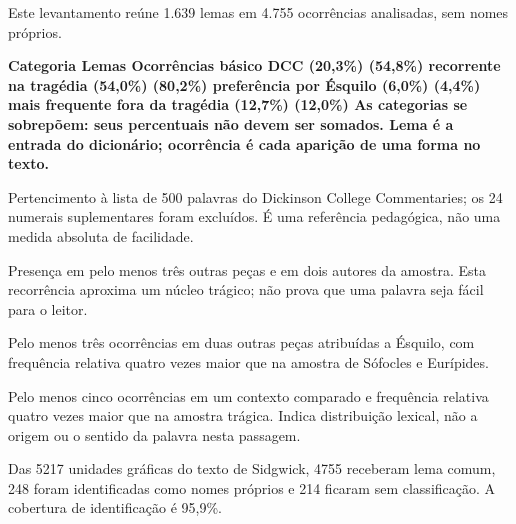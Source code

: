 \page
\setupbackgrounds[page][background=appendixfurniture]
\switchtobodyfont[11pt]
\setupinterlinespace[line=15pt]
\par
{}\par
\blank[2mm]
Este levantamento reúne 1.639 lemas em 4.755 ocorrências analisadas, sem nomes próprios.
\par\blank[3mm]
\starttabulate[|p(56mm)|r|r|]
\NC \bf Categoria \NC \bf Lemas \NC \bf Ocorrências \NC\NR
\HL
\NC básico DCC (20,3\%)  (54,8\%) \NC\NR
\NC recorrente na tragédia (54,0\%)  (80,2\%) \NC\NR
\NC preferência por Ésquilo (6,0\%)  (4,4\%) \NC\NR
\NC mais frequente fora da tragédia (12,7\%)  (12,0\%) \NC\NR
\stoptabulate
\blank[3mm]
As categorias se sobrepõem: seus percentuais não devem ser somados. Lema é a entrada do dicionário; ocorrência é cada aparição de uma forma no texto.\par
{}\par
{} Pertencimento à lista de 500 palavras do Dickinson College Commentaries; os 24 numerais suplementares foram excluídos. É uma referência pedagógica, não uma medida absoluta de facilidade.\par
{} Presença em pelo menos três outras peças e em dois autores da amostra. Esta recorrência aproxima um núcleo trágico; não prova que uma palavra seja fácil para o leitor.\par
{} Pelo menos três ocorrências em duas outras peças atribuídas a Ésquilo, com frequência relativa quatro vezes maior que na amostra de Sófocles e Eurípides.\par
{} Pelo menos cinco ocorrências em um contexto comparado e frequência relativa quatro vezes maior que na amostra trágica. Indica distribuição lexical, não a origem ou o sentido da palavra nesta passagem.\par
\page
{\switchtobodyfont[18pt]\color[accent]{Corpus e limites}}\par
{}\par
\blank[2mm]
Das 5217 unidades gráficas do texto de Sidgwick, 4755 receberam lema comum, 248 foram identificadas como nomes próprios e 214 ficaram sem classificação. A cobertura de identificação é 95,9\%.\par
